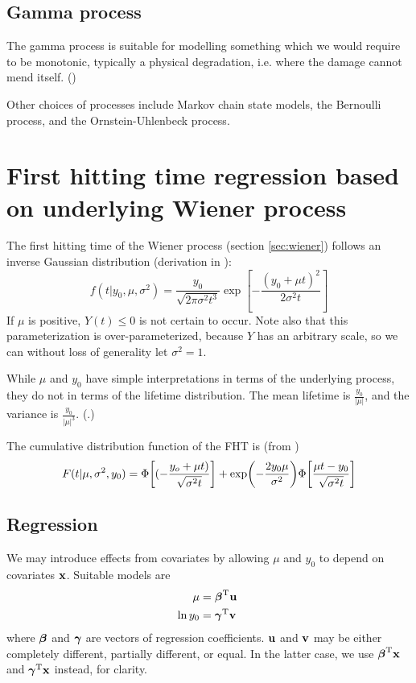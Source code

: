\subsection{Gamma process}
The gamma process is suitable for modelling something which we would require to be monotonic, typically a physical degradation, i.e. where the damage cannot mend itself. (\cite[59]{caroni2017})

Other choices of processes include Markov chain state models, the Bernoulli process, and the Ornstein-Uhlenbeck process.

\section{First hitting time regression based on underlying Wiener process}
The first hitting time of the Wiener process (section \ref{sec:wiener}) follows an inverse Gaussian distribution (derivation in \cite[23-29]{chhikara1988}):
\begin{equation}
\label{eq:fht-ig}
    f(t|y_0,\mu,\sigma^2)=\frac{y_0}{\sqrt{2\pi\sigma^2t^3}}\exp\left[-\frac{(y_0+\mu t)^2}{2\sigma^2t}\right]
\end{equation}
If $\mu$ is positive, $Y(t)\leq 0$ is not certain to occur. Note also that this parameterization is over-parameterized, because $Y$ has an arbitrary scale, so we can without loss of generality let $\sigma^2=1$.

While $\mu$ and $y_0$ have simple interpretations in terms of the underlying process, they do not in terms of the lifetime distribution. The mean lifetime is $\frac{y_0}{|\mu|}$, and the variance is $\frac{y_0}{|\mu|^3}$. (\cite[62]{caroni2017}.)

The cumulative distribution function of the FHT is (from \cite[7]{threg})
\begin{equation}\label{eq:cumulative}
    F(t|\mu,\sigma^2,y_0)=\Phi\sqb*{(-\frac{y_o+\mu t)}{\sqrt{\sigma^2t}}}+\exp\p*{-\frac{2y_0\mu}{\sigma^2}}\Phi\sqb*{\frac{\mu t-y_0}{\sqrt{\sigma^2t}}}
\end{equation}

\subsection{Regression}
We may introduce effects from covariates by allowing $\mu$ and $y_0$ to depend on covariates $\mathbf{x}$. Suitable models are
\begin{align}
    \mu&=\bbeta^\T\u \\
    \ln y_0&=\bgamma^\T\v
\end{align}
where $\boldsymbol{\beta}$ and $\boldsymbol{\gamma}$ are vectors of regression coefficients. $\mathbf{u}$ and $\mathbf{v}$ may be either completely different, partially different, or equal. In the latter case, we use $\boldsymbol{\beta}^{\text{T}}\mathbf{x}$ and $\boldsymbol{\gamma}^{\text{T}}\mathbf{x}$ instead, for clarity.

